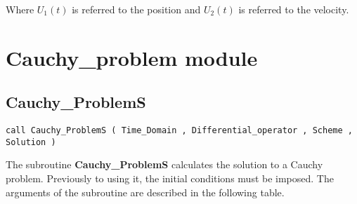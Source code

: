 Where $U_{1}(t)$ is referred to the position and $U_{2}(t)$ is referred to the velocity.

\newpage

\par\vspace{\baselineskip}
\lstset{language=Fortran}



\newpage

\section{Cauchy\_problem module}

\subsection*{Cauchy\_ProblemS}

\lstset{language=Fortran}
\begin{lstlisting}[frame=trBL]
call Cauchy_ProblemS ( Time_Domain , Differential_operator , Scheme , Solution )   \end{lstlisting}   

The subroutine \textbf{Cauchy\_ProblemS} calculates the solution to a Cauchy problem. Previously to using it, the initial conditions must be imposed. The arguments of the subroutine are described in the following table.

